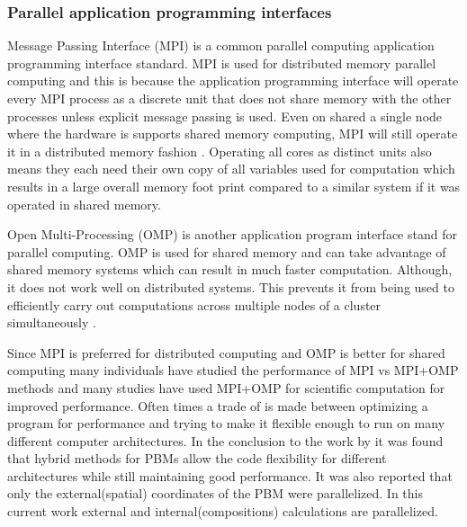 \documentclass[preprint,11pt,authoryear]{elsarticle}
\begin{document}
\subsubsection{Parallel application programming interfaces}
Message Passing Interface (MPI) is a common parallel computing application 
programming interface 
standard. MPI is used for distributed memory parallel computing and this is 
because the application programming interface will operate 
every MPI process as a discrete unit that does not share memory with the other processes unless explicit 
message passing is used. Even on shared a single node where the hardware is supports shared 
memory computing, MPI will still operate it in a distributed memory fashion \citep{Jin2011}. Operating all 
cores as distinct units also means they each need their own copy of all variables used for computation 
which results in a large overall memory foot print compared to a similar system if it was operated in 
shared memory. 

Open Multi-Processing (OMP) is another application program interface stand for parallel 
computing. OMP is used for shared memory and can take advantage of shared memory systems which 
can result in much faster computation. Although, it does not work well on distributed systems. This 
prevents it from being used to efficiently carry out computations across multiple nodes of a cluster 
simultaneously \citep{Jin2011}. 

Since MPI is preferred for distributed computing and OMP is better for shared computing many 
individuals have studied the performance of MPI vs MPI+OMP methods and many studies have used 
MPI+OMP for scientific computation for improved performance. Often times a trade of is made 
between optimizing a program for performance and trying to make it flexible enough to run on many 
different computer architectures. In the conclusion to the work by \cite{Bettencourt2017} it was found 
that hybrid methods for PBMs allow the code flexibility for different architectures while still maintaining 
good performance.  It was also reported that only the external(spatial) coordinates of the PBM were 
parallelized. In this current work external and internal(compositions) calculations are parallelized. 
\end{document}
